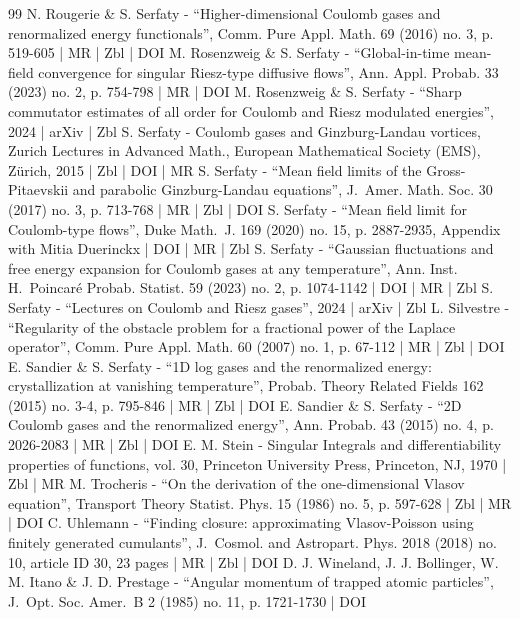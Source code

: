 \begin{thebibliography}{99}
N. Rougerie \& S. Serfaty - “Higher-dimensional Coulomb gases and renormalized energy functionals”, Comm. Pure Appl. Math. 69 (2016) no. 3, p. 519-605 | MR | Zbl | DOI
M. Rosenzweig \& S. Serfaty - “Global-in-time mean-field convergence for singular Riesz-type diffusive flows”, Ann. Appl. Probab. 33 (2023) no. 2, p. 754-798 | MR | DOI
M. Rosenzweig \& S. Serfaty - “Sharp commutator estimates of all order for Coulomb and Riesz modulated energies”, 2024 | arXiv | Zbl
S. Serfaty - Coulomb gases and Ginzburg-Landau vortices, Zurich Lectures in Advanced Math., European Mathematical Society (EMS), Zürich, 2015 | Zbl | DOI | MR
S. Serfaty - “Mean field limits of the Gross-Pitaevskii and parabolic Ginzburg-Landau equations”, J. Amer. Math. Soc. 30 (2017) no. 3, p. 713-768 | MR | Zbl | DOI
S. Serfaty - “Mean field limit for Coulomb-type flows”, Duke Math. J. 169 (2020) no. 15, p. 2887-2935, Appendix with Mitia Duerinckx | DOI | MR | Zbl
S. Serfaty - “Gaussian fluctuations and free energy expansion for Coulomb gases at any temperature”, Ann. Inst. H. Poincaré Probab. Statist. 59 (2023) no. 2, p. 1074-1142 | DOI | MR | Zbl
S. Serfaty - “Lectures on Coulomb and Riesz gases”, 2024 | arXiv | Zbl
L. Silvestre - “Regularity of the obstacle problem for a fractional power of the Laplace operator”, Comm. Pure Appl. Math. 60 (2007) no. 1, p. 67-112 | MR | Zbl | DOI
E. Sandier \& S. Serfaty - “1D log gases and the renormalized energy: crystallization at vanishing temperature”, Probab. Theory Related Fields 162 (2015) no. 3-4, p. 795-846 | MR | Zbl | DOI
E. Sandier \& S. Serfaty - “2D Coulomb gases and the renormalized energy”, Ann. Probab. 43 (2015) no. 4, p. 2026-2083 | MR | Zbl | DOI
E. M. Stein - Singular Integrals and differentiability properties of functions, vol. 30, Princeton University Press, Princeton, NJ, 1970 | Zbl | MR
M. Trocheris - “On the derivation of the one-dimensional Vlasov equation”, Transport Theory Statist. Phys. 15 (1986) no. 5, p. 597-628 | Zbl | MR | DOI
C. Uhlemann - “Finding closure: approximating Vlasov-Poisson using finitely generated cumulants”, J. Cosmol. and Astropart. Phys. 2018 (2018) no. 10, article ID 30, 23 pages | MR | Zbl | DOI
D. J. Wineland, J. J. Bollinger, W. M. Itano \& J. D. Prestage - “Angular momentum of trapped atomic particles”, J. Opt. Soc. Amer. B 2 (1985) no. 11, p. 1721-1730 | DOI
\end{thebibliography}
